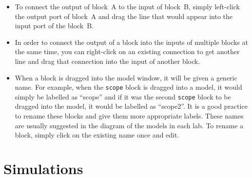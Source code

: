 \begin{itemize}
    \item To connect the output of block~A to the input of block~B, simply
          left-click the output port of block~A and drag the line that would appear
          into the input port of the block~B.

    \item In order to connect the output of a block into the inputs of multiple
          blocks at the same time, you can right-click on an existing connection to get
          another line and drag that connection into the input of another block.

    \item When a block is dragged into the model window, it will be given a
          generic name.  For example, when the \verb|scope| block is dragged into a
          model, it would simply be labelled as ``scope'' and if it was the second
          \verb|scope| block to be dragged into the model, it would be labelled as
          ``scope2''.  It is a good practice to rename these blocks and give them more
          appropriate labels.  These names are usually suggested in the diagram of the
          models in each lab. To rename a block, simply click on the existing name once
          and edit.
\end{itemize}

\section{Simulations}

